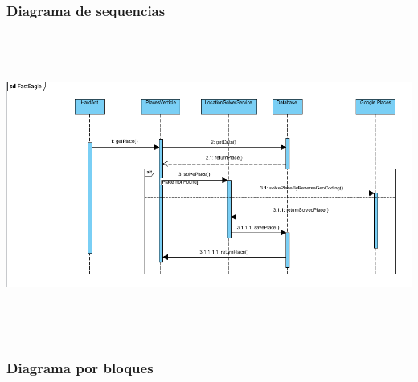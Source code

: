     \subsubsection{Diagrama de sequencias}
    \begin{center}
      \includegraphics[width=16cm,height=10cm]{./images/FastEagleSequenceDiagram}
    \end{center}
    \subsubsection{Diagrama por bloques}
